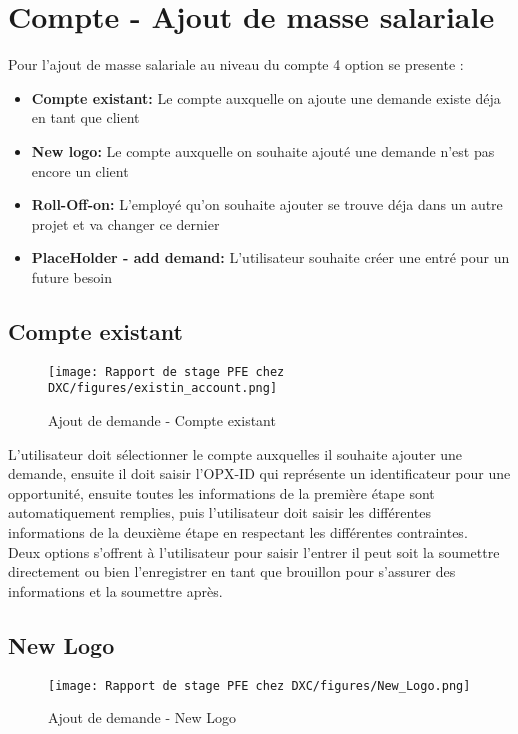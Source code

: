 \newpage
\section{Compte - Ajout de masse salariale}
Pour l'ajout de masse salariale au niveau du compte 4 option se presente :

\begin{itemize}
    \item \textbf{Compte existant:} Le compte auxquelle on ajoute une demande existe déja en tant que client
    \item \textbf{New logo:}  Le compte auxquelle on souhaite ajouté une demande n'est pas encore un client
    \item \textbf{Roll-Off\Roll-on:} L'employé qu'on souhaite ajouter se trouve déja dans un autre projet et va changer ce dernier
    \item \textbf{PlaceHolder - add demand:} L'utilisateur souhaite créer une entré pour un future besoin
\end{itemize}

\subsection{Compte existant}

\begin{figure}[!h]
    \centering
    \texttt{[image: Rapport de stage PFE chez DXC/figures/existin\_account.png]}
    \caption{Ajout de demande - Compte existant}
\end{figure}

L'utilisateur doit sélectionner le compte auxquelles il souhaite ajouter une demande, ensuite il doit saisir l'OPX-ID qui représente un identificateur pour une opportunité, ensuite toutes les informations de la première étape sont automatiquement remplies, puis l'utilisateur doit saisir les différentes informations de la deuxième étape en respectant les différentes contraintes. 
\\[0.3cm]
Deux options s’offrent à l'utilisateur pour saisir l’entrer il peut soit la soumettre directement ou bien l'enregistrer en tant que brouillon pour s'assurer des informations et la soumettre après.

\newpage
\subsection{New Logo}

\begin{figure}[!h]
    \centering
    \texttt{[image: Rapport de stage PFE chez DXC/figures/New\_Logo.png]}
    \caption{Ajout de demande - New Logo}
\end{figure}

